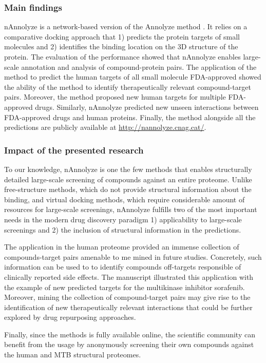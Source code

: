 \documentclass[12pt, b5paper,twoside]{tesi_upf}
\begin{document}
 \subsubsection{Main findings}
 \par nAnnolyze is a network-based version of the Annolyze method \cite{Marti-Renom2007}. It relies on a comparative docking approach that 1) predicts the protein targets of small molecules and 2) identifies the binding location on the 3D structure of the protein. The evaluation of the performance showed that nAnnolyze enables large-scale annotation and analysis of compound-protein pairs. The application of the method to predict the human targets of all small molecule FDA-approved showed the ability of the method to identify therapeutically relevant compound-target pairs. Moreover, the method proposed new human targets for multiple FDA-approved drugs. Similarly, nAnnolyze predicted new unseen interactions between FDA-approved drugs and human proteins. Finally, the method alongside all the predictions are publicly available at \url{http://nannolyze.cnag.cat/}.
 \subsubsection{Impact of the presented research} 
 \par To our knowledge, nAnnolyze is one the few methods that enables structurally detailed large-scale screening of compounds against an entire proteome. Unlike free-structure methods, which do not provide structural information about the binding, and virtual docking methods, which require considerable amount of resources for large-scale screenings, nAnnolyze fulfills two of the most important needs in the modern drug discovery paradigm 1) applicability to large-scale screenings and 2) the inclusion of structural information in the predictions. 
 \par The application in the human proteome provided an immense collection of compounds-target pairs amenable to me mined in future studies. Concretely, such information can be used to to identify compounds off-targets responsible of clinically reported side effects. The manuscript illustrated this application with the example of new predicted targets for the multikinase inhibitor sorafenib. Moreover, mining the collection of compound-target pairs may give rise to the identification of new therapeutically relevant interactions that could be further explored by drug repurposing approaches.  
 \par Finally, since the methods is fully available online, the scientific community can benefit from the usage by anonymously screening their own compounds against the human and MTB structural proteomes.
    
\end{document}
